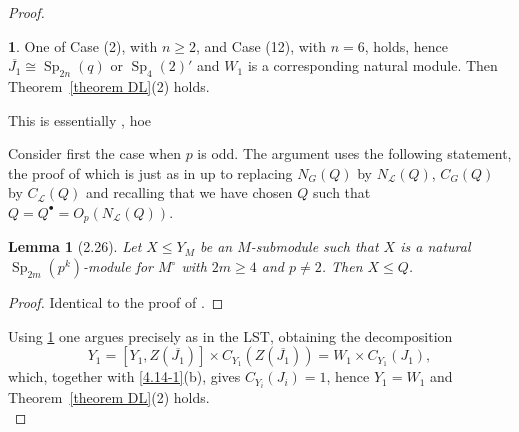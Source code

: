 \documentclass{amsart}
\numberwithin{equation}{section}
\newtheorem{lemma}[equation]{Lemma}
\theoremstyle{definition}
\theoremstyle{subresult}
\theoremstyle{caseresult}
\newtheorem{caseresult}{}[equation]
\renewcommand{\L}{\mathcal{L}}
\newcommand{\Sp}{\operatorname{Sp}}
\newcommand{\ov}{\overline}
\newcommand{\<}{\langle}
\renewcommand{\>}{\rangle}
\begin{document}
\begin{proof}
	\begin{caseresult}
		One of Case (2), with $n \ge 2$, and Case (12), with $n=6$, holds, hence $\ov{J_1} \cong \Sp_{2n}(q)$ or $\Sp_4(2)'$ and $W_1$ is a corresponding natural module. Then Theorem~\ref{theorem DL}(2) holds.
	\end{caseresult}
	This is essentially \cite[Lemma 4.14, Case 2]{Meier-Stell-Stroth:2012}, hoe

	Consider first the case when $p$ is odd. The argument uses the following statement, the proof of which is just as in \cite[Lemma 2.26]{Meier-Stell-Stroth:2012} up to replacing $N_G(Q)$ by $N_\L(Q)$, $C_G(Q)$ by $C_\L(Q)$ and recalling that we have chosen $Q$ such that $Q=Q^\bullet = O_p(N_\L(Q))$.
	\begin{lemma}[2.26]
		\label{lemma2.26}
		Let $X \le Y_M$ be an $M$-submodule such that $X$ is a natural $\Sp_{2m}(p^k)$-module for $M^\circ$ with $2m \ge 4$ and $p \ne 2$. Then $X \le Q$.
	\end{lemma}
	\begin{proof}
		Identical to the proof of \cite[Lemma 2.26]{Meier-Stell-Stroth:2012}.
	\end{proof}
	Using \ref{lemma2.26} one argues precisely as in the LST, obtaining the decomposition
		\[
	Y_1 = [Y_1,Z(\ov{J_1})] \times C_{Y_1}(Z(\ov{J_1})) = W_1 \times C_{Y_1}(J_1),
	\]
	which, together with \eqref{4.14-1}(b), gives $C_{Y_i}(J_i) =1$, hence $Y_1=W_1$ and Theorem~\ref{theorem DL}(2) holds.\\
	

\end{proof}
\end{document}
